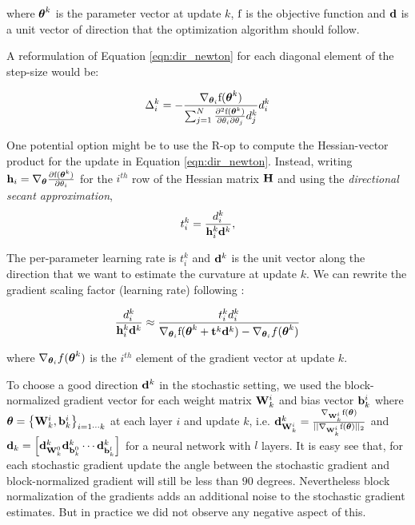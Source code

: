 \documentclass{article}
\begin{document}
where ${\boldsymbol{\theta}}^k$ is the parameter vector at update $k$, $\text{f}$ is the objective function and $\mathbf{d}$ is a
unit vector of direction that the optimization algorithm should follow.

A reformulation of Equation \ref{eqn:dir_newton} for each diagonal element of the step-size would be:

\begin{equation}
\Delta_i^k = - \frac{\nabla_{{\boldsymbol{\theta}}_i }\text{f}({\boldsymbol{\theta}}^k)}{\sum_{j=1}^{N} \frac{\partial^2 \text{f}({\boldsymbol{\theta}}^k)}{\partial\theta_i \partial\theta_j} d_j^k} d_i^k
\end{equation}

One potential option might be to use the R-op to compute the Hessian-vector product
\citep{schraudolph2002fast} for the update in Equation \ref{eqn:dir_newton}. Instead, 
writing $\mathbf{h}_i=\nabla_{{\boldsymbol{\theta}}}\frac{\partial \text{f}({\boldsymbol{\theta}}^k)}{\partial \theta_i}$ for the $i^{th}$ row of the Hessian 
matrix ${\mathbf H}$ and using the {\em directional secant approximation},
\begin{equation}
t_i^k=\frac{d_i^k}{\mathbf{h}^k_i\mathbf{d}^k},
\end{equation}

The per-parameter learning rate is $t_{i}^k$ and $\mathbf{d}^k$ is the unit vector along the direction that we want to estimate the
curvature at update $k$. We can rewrite the gradient scaling factor (learning rate) following \citet{an2005directional}:

\begin{equation}
\frac{d_i^k}{\mathbf{h}_i^k \mathbf{d}^k} \approx \frac{t_i^{k} d_i^k}{\nabla_{{\boldsymbol{\theta}}_i} \text{f}({\boldsymbol{\theta}}^k + \mathbf{t}^{k} \mathbf{d}^k) - \nabla_{{\boldsymbol{\theta}}_i} f({\boldsymbol{\theta}}^k)}
\end{equation}

where $\nabla_{{\boldsymbol{\theta}}_i} f({\boldsymbol{\theta}}^k)$ is the $i^{th}$ element of the gradient vector at update $k$.


To choose a good direction $\mathbf{d}^k$ in the stochastic setting, we used the block-normalized
gradient vector for each weight matrix $\mathbf{W}^i_k$ and bias vector $\mathbf{b}^i_k$ where
${\boldsymbol{\theta}}=\left\{\mathbf{W}^i_k, \mathbf{b}^i_k\right\}_{i=1\cdots k}$ at each layer $i$ and update $k$,
   i.e. $\mathbf{d}_{\mathbf{W}^i_k}^k = \frac{\nabla_{\mathbf{W}^i_k} \text{f}({\boldsymbol{\theta}})}{||\nabla_{\mathbf{W}^i_k} \text{f}({\boldsymbol{\theta}})||_2}$ and 
$\mathbf{d}_k = \left[ \mathbf{d}_{\mathbf{W}^0_k}^k \mathbf{d}_{\mathbf{b}^0_k}^k \cdots \mathbf{d}_{\mathbf{b}^l_k}^k\right]$ for a neural
network with $l$ layers. It is easy see that, for each stochastic gradient update the angle 
between the stochastic gradient and block-normalized gradient will still be less than $90$
degrees. Nevertheless block normalization of the gradients adds an additional noise to the stochastic 
gradient estimates. But in practice we did not observe any negative aspect of this.
\end{document}
